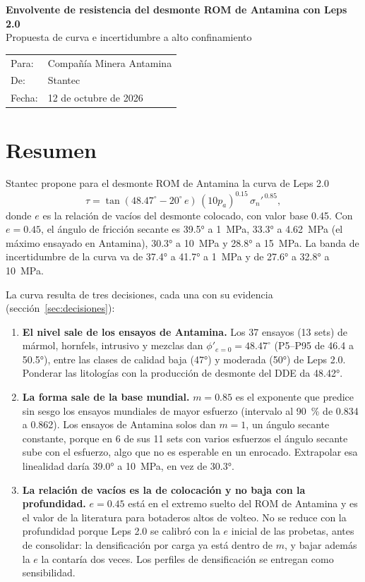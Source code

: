 \documentclass[11pt,letterpaper]{article}
\begin{document}
\begin{center}{\Large\textbf{Envolvente de resistencia del desmonte ROM de Antamina con Leps 2.0}}\\[3pt]{\large Propuesta de curva e incertidumbre a alto confinamiento}\end{center}
\vspace{4pt}
\noindent\begin{tabular}{@{}p{3.2cm}p{12.6cm}@{}}\toprule
Para: & Compañía Minera Antamina\\
De: & Stantec\\
Fecha: & 12 de octubre de 2026\\\bottomrule
\end{tabular}

\section*{Resumen}
Stantec propone para el desmonte ROM de Antamina la curva de Leps 2.0
\begin{equation*}
\tau = \tan\!\left(48.47^{\circ} - 20^{\circ}\,e\right)\,(10p_a)^{0.15}\,\sigma_n'^{\,0.85},
\end{equation*}
donde $e$ es la relación de vacíos del desmonte colocado, con valor base 0.45. Con $e = 0.45$, el ángulo de fricción secante es 39.5° a 1~MPa, 33.3° a 4.62~MPa (el máximo ensayado en Antamina), 30.3° a 10~MPa y 28.8° a 15~MPa. La banda de incertidumbre de la curva va de 37.4° a 41.7° a 1~MPa y de 27.6° a 32.8° a 10~MPa.

La curva resulta de tres decisiones, cada una con su evidencia (sección~\ref{sec:decisiones}):
\begin{enumerate}
\item \textbf{El nivel sale de los ensayos de Antamina.} Los 37 ensayos (13 sets) de mármol, hornfels, intrusivo y mezclas dan $\phi'_{e=0} = 48.47^{\circ}$ (P5--P95 de 46.4 a 50.5°), entre las clases de calidad baja (47°) y moderada (50°) de Leps 2.0. Ponderar las litologías con la producción de desmonte del DDE da 48.42°.
\item \textbf{La forma sale de la base mundial.} $m = 0.85$ es el exponente que predice sin sesgo los ensayos mundiales de mayor esfuerzo (intervalo al 90~\% de 0.834 a 0.862). Los ensayos de Antamina solos dan $m = 1$, un ángulo secante constante, porque en 6 de sus 11 sets con varios esfuerzos el ángulo secante sube con el esfuerzo, algo que no es esperable en un enrocado. Extrapolar esa linealidad daría 39.0° a 10~MPa, en vez de 30.3°.
\item \textbf{La relación de vacíos es la de colocación y no baja con la profundidad.} $e = 0.45$ está en el extremo suelto del ROM de Antamina y es el valor de la literatura para botaderos altos de volteo. No se reduce con la profundidad porque Leps 2.0 se calibró con la $e$ inicial de las probetas, antes de consolidar: la densificación por carga ya está dentro de $m$, y bajar además la $e$ la contaría dos veces. Los perfiles de densificación se entregan como sensibilidad.
\end{enumerate}
\end{document}
